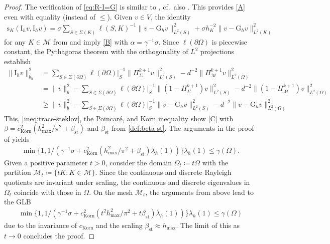 \documentclass[a4paper]{amsart}
\numberwithin{equation}{section}
\newcommand{\I}{\mathrm{I}}
\newcommand{\Mcal}{\mathcal{M}}
\newcommand{\s}{\mathrm{s}}
\theoremstyle{remark}
\theoremstyle{definition}
\theoremstyle{assumptionnoperiod}
\begin{document}
\begin{proof}
	The verification of \eqref{eq:R-I=G} is similar to , cf.~also \cite{DiPietroErn2015}. This provides \ref{A} even with equality (instead of $\leq$).
	Given $v \in V$,
	the identity
	\begin{align*}
		\s_K(\I_h v, \I_h v) = \sigma \sum_{S \in \Sigma(K)} \ell(S,K)^{-1}\|v - \mathrm{G}_h v\|^2_{L^2(S)} + \sigma h_K^{-2}\|v - \mathrm{G}_h v\|_{L^2(K)}^2
	\end{align*}
	for any $K \in \Mcal$ from  and  imply \ref{B} with $\alpha = \gamma^{-1}\sigma$. 
	Since $\ell(\partial \Omega)$ is piecewise constant,
	the Pythagoras theorem with the orthogonality of $L^2$ projections establish
	\begin{align*}
		\|\I_h v\|_{b_h}^2 &= \sum_{S \in \Sigma(\partial \Omega)} \ell(\partial \Omega)|_S^{-1} \|\Pi_\Sigma^{k+1} v\|^2_{L^2(S)} - d^{-2}\|\Pi_\Mcal^{k+1} v\|_{L^2(\Omega)}^2\\
		&= \|v\|_b^2 - \sum_{S \in \Sigma(\partial \Omega)} \ell(\partial \Omega)|_S^{-1} \|(1 - \Pi_\Sigma^{k+1}) v\|^2_{L^2(S)} - d^{-2}\|(1 - \Pi_\Mcal^{k+1}) v\|_{L^2(\Omega)}^2\\
		&\geq \|v\|_b^2 - \sum_{S \in \Sigma(\partial \Omega)} \ell(\partial \Omega)|_S^{-1} \|v - \mathrm{G}_h v\|^2_{L^2(S)} - d^{-2}\|v - \mathrm{G}_h v\|_{L^2(\Omega)}^2
	\end{align*}
	This, \eqref{ineq:trace-steklov}, the Poincar\'e, and Korn inequality show \ref{C} with $\beta = c_\mathrm{Korn}^2(h_\mathrm{max}^2/\pi^2 + \beta_\mathrm{st})$ and $\beta_\mathrm{st}$ from \eqref{def:beta-st}.
	The arguments in the proof of  yields
	\begin{align*}
		\min\{1,1/(\gamma^{-1} \sigma + c_\mathrm{Korn}^2 (h_\mathrm{max}^2/\pi^2 + \beta_\mathrm{st})\lambda_h(1))\}\lambda_h(1) \leq \gamma(\Omega).
	\end{align*}
	Given a positive parameter $t > 0$, consider the domain $\Omega_t \coloneqq t \Omega$ with the partition $\Mcal_t \coloneqq \{t K: K \in \Mcal\}$.
	Since the continuous and discrete Rayleigh quotients are invariant under scaling, the continuous and discrete eigenvalues in $\Omega_t$ coincide with those in $\Omega$.
	On the mesh $\Mcal_t$, the arguments from above lead to the GLB
	\begin{align*}
		\min\{1,1/(\gamma^{-1} \sigma + c_\mathrm{Korn}^2 (t^2h_\mathrm{max}^2/\pi^2 + t\beta_\mathrm{st})\lambda_h(1))\}\lambda_h(1) \leq \gamma(\Omega)
	\end{align*}
	due to the invariance of $c_\mathrm{Korn}$ and the scaling $\beta_\mathrm{st} \approx h_\mathrm{max}$.
	The limit of this as $t \to 0$ concludes the proof.
\end{proof}
\end{document}
